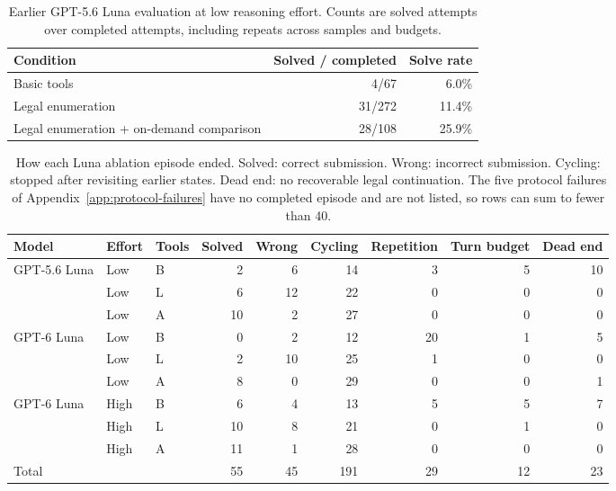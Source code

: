 \begin{table}[htbp]
\centering
\caption{Earlier GPT-5.6 Luna evaluation at low reasoning effort. Counts are solved
attempts over completed attempts, including repeats across samples and budgets.}
\label{tab:headline}
\begin{tabular}{lrr}
\hline
Condition & Solved / completed & Solve rate \\
\hline
Basic tools & 4/67 & 6.0\% \\
Legal enumeration & 31/272 & 11.4\% \\
Legal enumeration + on-demand comparison & 28/108 & 25.9\% \\
\hline
\end{tabular}
\end{table}

\begin{table}[htbp]
\centering
\caption{How each Luna ablation episode ended. Solved: correct submission. Wrong: incorrect
submission. Cycling: stopped after revisiting earlier states. Dead end: no recoverable legal
continuation. The five protocol failures of Appendix~\ref{app:protocol-failures} have no
completed episode and are not listed, so rows can sum to fewer than 40.}
\label{tab:ablation-terminations}
\small
\setlength{\tabcolsep}{4pt}
\begin{tabular}{lllrrrrrr}
\hline
Model & Effort & Tools & Solved & Wrong & Cycling & Repetition & Turn budget & Dead end \\
\hline
GPT-5.6 Luna & Low & B & 2 & 6 & 14 & 3 & 5 & 10 \\
 & Low & L & 6 & 12 & 22 & 0 & 0 & 0 \\
 & Low & A & 10 & 2 & 27 & 0 & 0 & 0 \\
\hline
GPT-6 Luna & Low & B & 0 & 2 & 12 & 20 & 1 & 5 \\
 & Low & L & 2 & 10 & 25 & 1 & 0 & 0 \\
 & Low & A & 8 & 0 & 29 & 0 & 0 & 1 \\
\hline
GPT-6 Luna & High & B & 6 & 4 & 13 & 5 & 5 & 7 \\
 & High & L & 10 & 8 & 21 & 0 & 1 & 0 \\
 & High & A & 11 & 1 & 28 & 0 & 0 & 0 \\
\hline
Total & & & 55 & 45 & 191 & 29 & 12 & 23 \\
\hline
\end{tabular}
\end{table}

